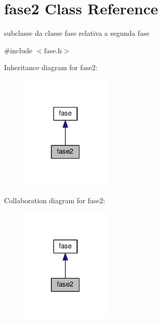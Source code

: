 \hypertarget{classfase2}{}\section{fase2 Class Reference}
\label{classfase2}


subclasse da classe fase relativa a segunda fase  




{\ttfamily \#include $<$fase.\+h$>$}



Inheritance diagram for fase2\+:\nopagebreak
\begin{figure}[H]
\begin{center}
\leavevmode
\includegraphics[width=121pt]{classfase2__inherit__graph}
\end{center}
\end{figure}


Collaboration diagram for fase2\+:\nopagebreak
\begin{figure}[H]
\begin{center}
\leavevmode
\includegraphics[width=121pt]{classfase2__coll__graph}
\end{center}
\end{figure}

